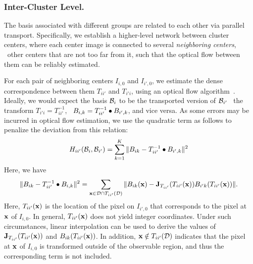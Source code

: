 \subsubsection{Inter-Cluster Level.}
%
The basis associated with different groups are related to each other
via parallel transport. Specifically, we establish a higher-level
network between cluster centers, where each center image is connected
to several \emph{neighboring centers}, \ie~other centers that are not
too far from it, such that the optical flow between them can be
reliably estimated.

For each pair of neighboring centers $I_{i,0}$ and $I_{i',0}$, we
estimate the dense correspondence between them $T_{ii'}$ and
$T_{i'i}$, using an optical flow algorithm~\cite{OF}.
Ideally, we would expect the basis $\mathcal{B}_{i}$ to be the transported
version of $\mathcal{B}_{i'}$ \wrt~the transform $T_{i'i} = T_{ii'}^{-1}$,
\ie~$B_{i,k} = T_{ii'}^{-1} \bullet B_{i',k}$, and vice versa. As some errors
may be incurred in optical flow estimation, we use the quadratic term as
follows to penalize the deviation from this relation:
\begin{equation}
    H_{ii'}(\mathcal{B}_i, \mathcal{B}_{i'}) = \sum_{k=1}^K \|B_{ik} - T_{ii'}^{-1} \bullet B_{i',k} \|^2
\end{equation}
Here, we have
\begin{equation}
    \| B_{ik} - T_{ii'}^{-1} \bullet B_{i,k} \|^2
    = \sum_{{\mathbf{x}} \in \mathcal{D} \cap T_{ii'}(\mathcal{D})}
    \| B_{ik}({\mathbf{x}}) -
    {\mathbf{J}}_{T_{ii'}}(T_{ii'}({\mathbf{x}})) B_{i'k}(T_{ii'}({\mathbf{x}}))
    \|.
\end{equation}
Here, $T_{ii'}({\mathbf{x}})$ is the location of the pixel on $I_{i',0}$
that corresponds to the pixel at ${\mathbf{x}}$ of $I_{i,0}$.
In general, $T_{ii'}({\mathbf{x}})$ does not yield integer coordinates.
Under such circumstances, linear interpolation can be used to
derive the values of ${\mathbf{J}}_{T_{ii'}}(T_{ii'}({\mathbf{x}}))$ and
$B_{ik}(T_{ii'}({\mathbf{x}}))$.
In addition, ${\mathbf{x}} \notin T_{ii'}(\mathcal{D})$ indicates that the pixel at
${\mathbf{x}}$ of $I_{i,0}$ is transformed outside of the observable region,
and thus the corresponding term is not included. 



